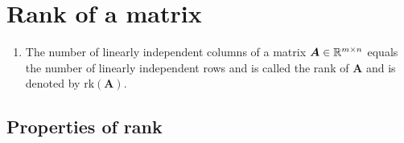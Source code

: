 \section{Rank of a matrix}

\begin{enumerate}
    \item
    \begin{definition}
        The number of linearly independent columns of a matrix $\bm{A} \in \mathbb{R}^{m\times n}$ equals the number of linearly independent rows and is called the rank of $\bm{A}$ and is denoted by $\text{rk}(\bm{A})$.
        \hfill \cite{mfml/book/mml/Deisenroth-Faisal-Ong}
    \end{definition}

\end{enumerate}


\subsection{Properties of rank}

